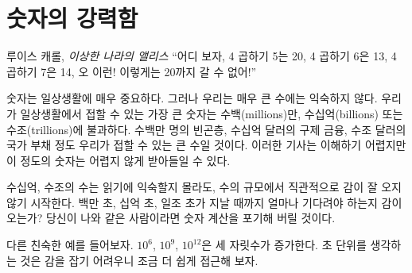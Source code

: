 \chapter{숫자의 강력함}
\label{les:15}

\begin{chapquote}{루이스 캐롤, \textit{이상한 나라의 앨리스}}
\enquote{어디 보자, 
	4 곱하기 5는 20, 
	4 곱하기 6은 13, 
	4 곱하기 7은 14, 
	오 이런! 이렇게는 20까지 갈 수 없어!}
\end{chapquote}

\begin{comment}
Numbers are an essential part of our everyday life. Large numbers,
however, aren't something most of us are too familiar with. The largest
numbers we might encounter in everyday life are in the range of
millions, billions, or trillions. We might read about millions of people
in poverty, billions of dollars spent on bank bailouts, and trillions of
national debt. Even though it's hard to make sense of these headlines,
we are somewhat comfortable with the size of those numbers.
\end{comment}
숫자는 일상생활에 매우 중요하다. 
그러나 우리는 매우 큰 수에는 익숙하지 않다.
우리가 일상생활에서 접할 수 있는 가장 큰 숫자는 수백(millions)만, 수십억(billions) 또는 수조(trillions)에 불과하다.
수백만 명의 빈곤층, 수십억 달러의 구제 금융, 수조 달러의 국가 부채 정도 우리가 접할 수 있는 큰 수일 것이다.
이러한 기사는 이해하기 어렵지만 이 정도의 숫자는 어렵지 않게 받아들일 수 있다.

\begin{comment}
Although we might seem comfortable with billions and trillions, our
intuition already starts to fail with numbers of this magnitude. Do you
have an intuition how long you would have to wait for a
million/billion/trillion seconds to pass? If you are anything like me,
you are lost without actually crunching the numbers.
\end{comment}
수십억, 수조의 수는 읽기에 익숙할지 몰라도, 수의 규모에서 직관적으로 감이 잘 오지 않기 시작한다.
백만 초, 십억 초, 일조 초가 지날 때까지 얼마나 기다려야 하는지 감이 오는가?
당신이 나와 같은 사람이라면 숫자 계산을 포기해 버릴 것이다.

\begin{comment}
Let's take a closer look at this example: the difference between each is an
increase by three orders of magnitude: $10^6$, $10^9$, $10^{12}$. Thinking about
seconds is not very useful, so let's translate this into something we can wrap
our head around:
\end{comment}
다른 친숙한 예를 들어보자. $10^6$, $10^9$, $10^{12}$은 세 자릿수가 증가한다. 
초 단위를 생각하는 것은 감을 잡기 어려우니 조금 더 쉽게 접근해 보자.

